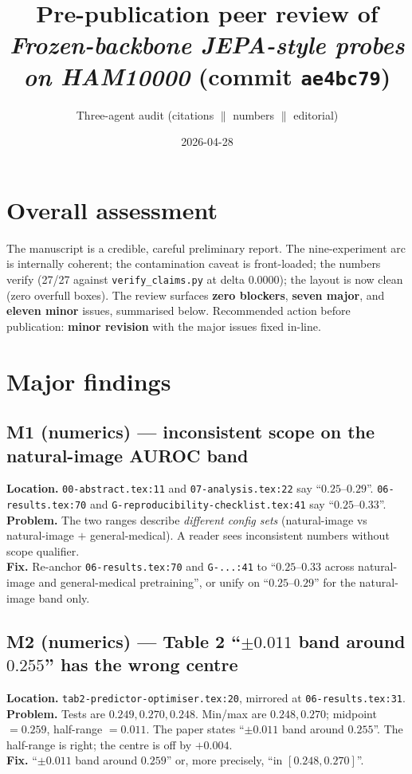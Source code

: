 \documentclass[11pt,a4paper]{article}
\title{Pre-publication peer review of \emph{Frozen-backbone JEPA-style probes
       on HAM10000} (commit \texttt{ae4bc79})}
\author{Three-agent audit (citations $\parallel$ numbers $\parallel$ editorial)}
\date{2026-04-28}
\begin{document}
\maketitle

\section*{Overall assessment}

The manuscript is a credible, careful preliminary report. The
nine-experiment arc is internally coherent; the contamination caveat is
front-loaded; the numbers verify (27/27 against \texttt{verify\_claims.py}
at delta $0.0000$); the layout is now clean (zero overfull boxes). The
review surfaces \textbf{zero blockers}, \textbf{seven major}, and
\textbf{eleven minor} issues, summarised below. Recommended action
before publication: \textbf{minor revision} with the major issues fixed
in-line.

\section{Major findings}

\subsection*{M1 (numerics) --- inconsistent scope on the natural-image
            AUROC band}
\textbf{Location.} \texttt{00-abstract.tex:11} and
\texttt{07-analysis.tex:22} say ``$0.25$--$0.29$''.
\texttt{06-results.tex:70} and
\texttt{G-reproducibility-checklist.tex:41} say ``$0.25$--$0.33$''.\\
\textbf{Problem.} The two ranges describe \emph{different config sets}
(natural-image vs natural-image $+$ general-medical). A reader sees
inconsistent numbers without scope qualifier.\\
\textbf{Fix.} Re-anchor \texttt{06-results.tex:70} and \texttt{G-...:41}
to ``$0.25$--$0.33$ across natural-image and general-medical
pretraining'', or unify on ``$0.25$--$0.29$'' for the natural-image
band only.

\subsection*{M2 (numerics) --- Table 2 ``$\pm 0.011$ band around
            $0.255$'' has the wrong centre}
\textbf{Location.} \texttt{tab2-predictor-optimiser.tex:20}, mirrored at
\texttt{06-results.tex:31}.\\
\textbf{Problem.} Tests are $0.249, 0.270, 0.248$. Min/max are
$0.248, 0.270$; midpoint $= 0.259$, half-range $= 0.011$. The paper
states ``$\pm 0.011$ band around $0.255$''. The half-range is right;
the centre is off by $+0.004$.\\
\textbf{Fix.} ``$\pm 0.011$ band around $0.259$'' or, more precisely,
``in $[0.248, 0.270]$''.
\end{document}

